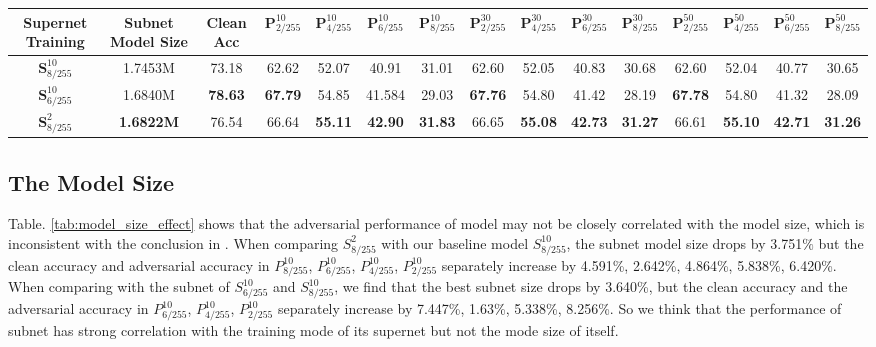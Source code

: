 \documentclass[journal]{IEEEtran}
\begin{document}
\begin{table*}[ht]
    \centering
    \setlength{\tabcolsep}{0.5mm}
    \caption{Supernet Transferability on Model Size with the term of accuracy on CIFAR-10 (\%)}
    \begin{tabular}{c|c|c|cccccccccccc}
    Supernet Training& Subnet Model Size & Clean Acc & $\textbf{P}_{2/255}^{10}$ & $\textbf{P}_{4/255}^{10}$ & $\textbf{P}_{6/255}^{10}$ & $\textbf{P}_{8/255}^{10}$ & $\textbf{P}_{2/255}^{30}$ & $\textbf{P}_{4/255}^{30}$ & $\textbf{P}_{6/255}^{30}$ & $\textbf{P}_{8/255}^{30}$ & $\textbf{P}_{2/255}^{50}$ & $\textbf{P}_{4/255}^{50}$ & $\textbf{P}_{6/255}^{50}$ & $\textbf{P}_{8/255}^{50}$\\
    \hline
    $\textbf{S}_{8/255}^{10}$ & 1.7453M & 73.18 & 62.62 & 52.07 & 40.91 & 31.01 & 62.60 & 52.05 & 40.83 & 30.68 & 62.60 & 52.04 & 40.77 & 30.65 \\
    \hline
    $\textbf{S}_{6/255}^{10}$ & 1.6840M & \textbf{78.63} & \textbf{67.79} & 54.85 & 41.584 & 29.03 & \textbf{67.76} & 54.80 & 41.42 & 28.19 & \textbf{67.78} & 54.80 & 41.32 & 28.09 \\
    \hline
    $\textbf{S}_{8/255}^{2}$ & \textbf{1.6822M} & 76.54 & 66.64 & \textbf{55.11} & \textbf{42.90}  & \textbf{31.83} & 66.65  & \textbf{55.08}  & \textbf{42.73}  & \textbf{31.27} & 66.61 & \textbf{55.10} & \textbf{42.71} & \textbf{31.26} \\
    \hline
    \end{tabular}\label{tab:model_size_effect}
\end{table*}

\subsection{\textbf{The Model Size}}
Table. \ref{tab:model_size_effect} shows that the adversarial performance of model may not be closely correlated with the model size, which is inconsistent with the conclusion in \cite{madry:madry2017towards}. When comparing $S_{8/255}^{2}$ with our baseline model $S_{8/255}^{10}$, the subnet model size drops by 3.751$\%$ but the clean accuracy and adversarial accuracy in $P_{8/255}^{10}$, $P_{6/255}^{10}$, $P_{4/255}^{10}$, $P_{2/255}^{10}$ separately increase by 4.591\%, 2.642\%, 4.864\%, 5.838\%, 6.420\%. When comparing with the subnet of $S_{6/255}^{10}$ and $S_{8/255}^{10}$, we find that the best subnet size drops by 3.640\%, but the clean accuracy and the adversarial accuracy in $P_{6/255}^{10}$, $P_{4/255}^{10}$, $P_{2/255}^{10}$ separately increase by 7.447\%, 1.63\%, 5.338\%, 8.256\%. So we think that the performance of subnet has strong correlation with the training mode of its supernet but not the mode size of itself.   
\end{document}
